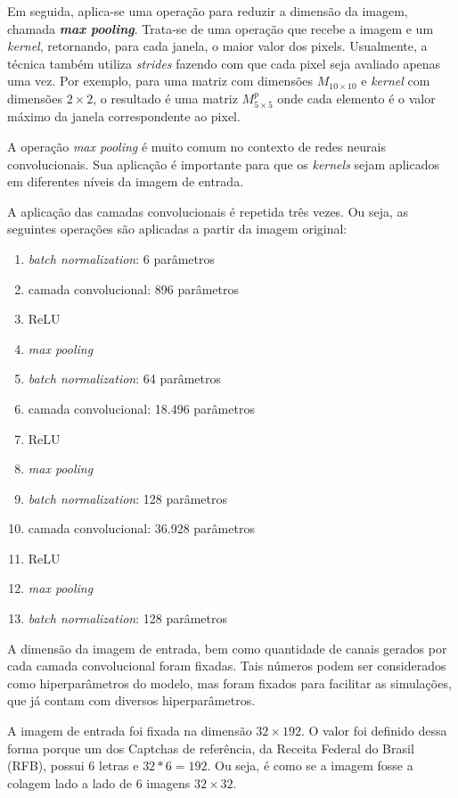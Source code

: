 \documentclass[12pt,twoside,brazilian]{book}
\providecommand{\tightlist}{%
  \setlength{\itemsep}{0pt}\setlength{\parskip}{0pt}}
\begin{document}
Em seguida, aplica-se uma operação para reduzir a dimensão da imagem,
chamada \textbf{\emph{max pooling}}. Trata-se de uma operação que recebe
a imagem e um \emph{kernel}, retornando, para cada janela, o maior valor
dos pixels. Usualmente, a técnica também utiliza \emph{strides} fazendo
com que cada pixel seja avaliado apenas uma vez. Por exemplo, para uma
matriz com dimensões \(M_{10\times10}\) e \emph{kernel} com dimensões
\(2\times2\), o resultado é uma matriz \(M^p_{5\times5}\) onde cada
elemento é o valor máximo da janela correspondente ao pixel.

A operação \emph{max pooling} é muito comum no contexto de redes neurais
convolucionais. Sua aplicação é importante para que os \emph{kernels}
sejam aplicados em diferentes níveis da imagem de entrada.

A aplicação das camadas convolucionais é repetida três vezes. Ou seja,
as seguintes operações são aplicadas a partir da imagem original:

\begin{enumerate}
\def\labelenumi{\arabic{enumi}.}
\tightlist
\item
  \emph{batch normalization}: 6 parâmetros
\item
  camada convolucional: 896 parâmetros
\item
  ReLU
\item
  \emph{max pooling}
\item
  \emph{batch normalization}: 64 parâmetros
\item
  camada convolucional: 18.496 parâmetros
\item
  ReLU
\item
  \emph{max pooling}
\item
  \emph{batch normalization}: 128 parâmetros
\item
  camada convolucional: 36.928 parâmetros
\item
  ReLU
\item
  \emph{max pooling}
\item
  \emph{batch normalization}: 128 parâmetros
\end{enumerate}

A dimensão da imagem de entrada, bem como quantidade de canais gerados
por cada camada convolucional foram fixadas. Tais números podem ser
considerados como hiperparâmetros do modelo, mas foram fixados para
facilitar as simulações, que já contam com diversos hiperparâmetros.

A imagem de entrada foi fixada na dimensão \(32\times192\). O valor foi
definido dessa forma porque um dos Captchas de referência, da Receita
Federal do Brasil (RFB), possui 6 letras e \(32*6=192\). Ou seja, é como
se a imagem fosse a colagem lado a lado de 6 imagens \(32\times32\).
\end{document}
